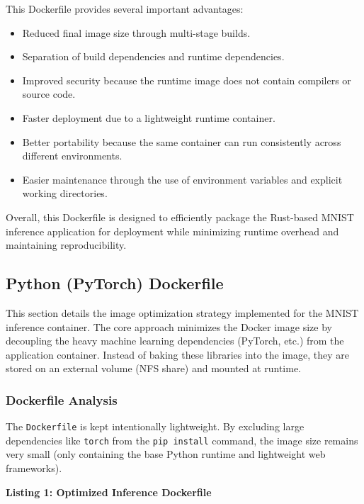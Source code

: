 \documentclass{ieeeaccess}
\begin{document}
This Dockerfile provides several important advantages:

\begin{itemize}
    \item Reduced final image size through multi-stage builds.
    \item Separation of build dependencies and runtime dependencies.
    \item Improved security because the runtime image does not contain compilers or source code.
    \item Faster deployment due to a lightweight runtime container.
    \item Better portability because the same container can run consistently across different environments.
    \item Easier maintenance through the use of environment variables and explicit working directories.
\end{itemize}

Overall, this Dockerfile is designed to efficiently package the Rust-based MNIST inference application for deployment while minimizing runtime overhead and maintaining reproducibility.

\subsection{Python (PyTorch) Dockerfile}

This section details the image optimization strategy implemented for the MNIST inference container. The core approach minimizes the Docker image size by decoupling the heavy machine learning dependencies (PyTorch, etc.) from the application container. Instead of baking these libraries into the image, they are stored on an external volume (NFS share) and mounted at runtime.

\subsubsection{Dockerfile Analysis}

The \texttt{Dockerfile} is kept intentionally lightweight. By excluding large dependencies like \texttt{torch} from the \texttt{pip install} command, the image size remains very small (only containing the base Python runtime and lightweight web frameworks).

\vspace{0.5em}
\noindent\textbf{Listing 1: Optimized Inference Dockerfile}
\label{lst:dockerfile_inference}
\vspace{0.3em}
\end{document}
